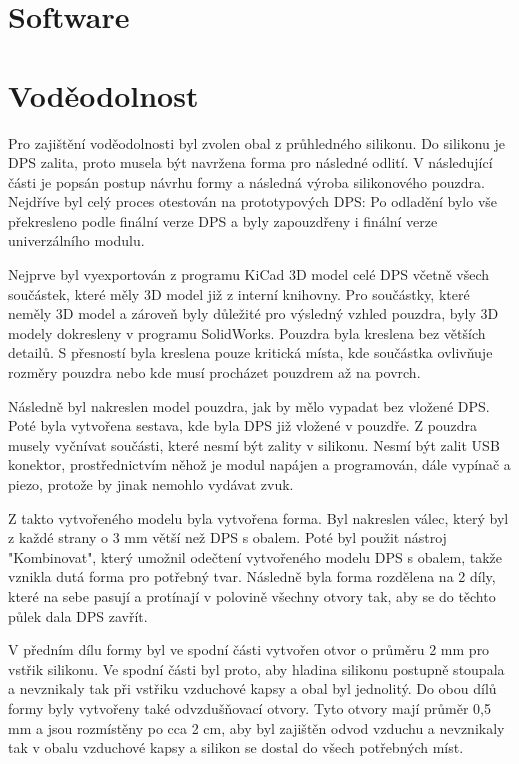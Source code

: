 \chapter{Software}



\chapter{Voděodolnost}
Pro zajištění voděodolnosti byl zvolen obal z průhledného silikonu. Do silikonu je DPS zalita, proto musela být navržena forma pro následné odlití. V následující části je popsán postup 
návrhu formy a následná výroba silikonového pouzdra. Nejdříve byl celý proces otestován na prototypových DPS: Po odladění bylo vše překresleno podle finální verze DPS a byly zapouzdřeny
i finální verze univerzálního modulu.  

Nejprve byl vyexportován z programu KiCad 3D model celé DPS včetně všech součástek, které měly 3D model již z interní knihovny. Pro součástky, které neměly 3D model a zároveň byly důležité 
pro výsledný vzhled pouzdra, byly 3D modely dokresleny v programu SolidWorks. Pouzdra byla kreslena bez větších detailů. S přesností byla kreslena pouze kritická místa, kde součástka ovlivňuje 
rozměry pouzdra nebo kde musí procházet pouzdrem až na povrch.


Následně byl nakreslen model pouzdra, jak by mělo vypadat bez vložené DPS. Poté byla vytvořena sestava, kde byla DPS již vložené v pouzdře. Z pouzdra musely vyčnívat součásti, které nesmí být 
zality v silikonu. Nesmí být zalit USB konektor, prostřednictvím něhož je modul napájen a programován, dále vypínač a piezo, protože by jinak nemohlo vydávat zvuk. 

Z takto vytvořeného modelu byla vytvořena forma. Byl nakreslen válec, který byl z každé strany o 3 mm větší než DPS s obalem. Poté byl použit nástroj "Kombinovat", který umožnil odečtení vytvořeného 
modelu DPS s obalem, takže vznikla dutá forma pro potřebný tvar. Následně byla forma rozdělena na 2 díly, které na sebe pasují a protínají v polovině všechny otvory tak, aby se do těchto půlek 
dala DPS zavřít.

V předním dílu formy byl ve spodní části vytvořen otvor o průměru 2 mm pro vstřik silikonu. Ve spodní části byl proto, aby hladina silikonu postupně stoupala a nevznikaly tak při vstřiku vzduchové 
kapsy a obal byl jednolitý. Do obou dílů formy byly vytvořeny také odvzdušňovací otvory. Tyto otvory mají průměr 0,5 mm a jsou rozmístěny po cca 2 cm, aby byl zajištěn odvod vzduchu a nevznikaly tak 
v obalu vzduchové kapsy a silikon se dostal do všech potřebných míst. 

